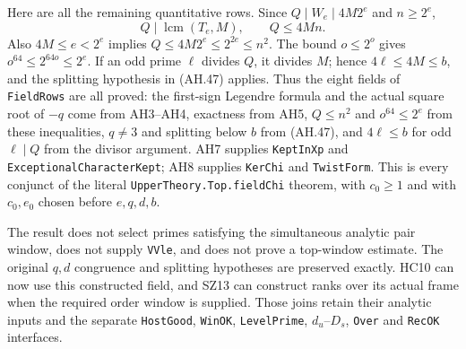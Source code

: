 Here are all the remaining quantitative rows. Since
$Q\mid W_e\mid4M2^e$ and $n\ge2^e$,
\[
 Q\mid\operatorname{lcm}(T_e,M),\qquad Q\le4Mn.
\]
Also $4M\le e<2^e$ implies
$Q\le4M2^e\le2^{2e}\le n^2$. The bound $o\le2^o$ gives
$o^{64}\le2^{64o}\le2^e$. If an odd prime $\ell$ divides $Q$, it divides
$M$; hence $4\ell\le4M\le b$, and the splitting hypothesis in (AH.47)
applies. Thus the eight fields of \texttt{FieldRows} are all proved:
the first-sign Legendre formula and the actual square root of $-q$ come
from AH3--AH4, exactness from AH5, $Q\le n^2$ and $o^{64}\le2^e$ from
these inequalities, $q\ne3$ and splitting below $b$ from (AH.47), and
$4\ell\le b$ for odd $\ell\mid Q$ from the divisor argument.
AH7 supplies \texttt{KeptInXp} and
\texttt{ExceptionalCharacterKept}; AH8 supplies \texttt{KerChi} and
\texttt{TwistForm}. This is every conjunct of the literal
\texttt{UpperTheory.Top.fieldChi} theorem, with $c_0\ge1$ and with
$c_0,e_0$ chosen before $e,q,d,b$.

The result does not select primes satisfying the simultaneous analytic
pair window, does not supply \texttt{VVle}, and does not prove a top-window
estimate. The original $q,d$ congruence and splitting hypotheses are
preserved exactly. HC10 can now use this constructed field, and SZ13 can
construct ranks over its actual frame when the required order window is
supplied. Those joins retain their analytic inputs and the separate
\texttt{HostGood}, \texttt{WinOK}, \texttt{LevelPrime},
$d_u$--$D_s$, \texttt{Over} and \texttt{RecOK} interfaces.

